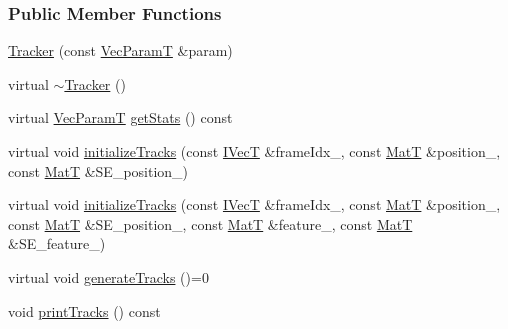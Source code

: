 \subsubsection*{Public Member Functions}
\begin{DoxyCompactItemize}
\item 
\hyperlink{classtracker_1_1Tracker_a27dea2aecabed66961d6d27b7a217d49}{Tracker} (const \hyperlink{classtracker_1_1Tracker_a1a79f7073d8e1a032369dcc8105604ce}{Vec\+ParamT} \&param)
\item 
virtual \hyperlink{classtracker_1_1Tracker_ab443f280a09da7d955e5e963a64b43cf}{$\sim$\+Tracker} ()
\item 
virtual \hyperlink{classtracker_1_1Tracker_a1a79f7073d8e1a032369dcc8105604ce}{Vec\+ParamT} \hyperlink{classtracker_1_1Tracker_a0ff525214ca14a98bacb8af427000cfa}{get\+Stats} () const 
\item 
virtual void \hyperlink{classtracker_1_1Tracker_a54cebc540275536380aca0d9ecb7e575}{initialize\+Tracks} (const \hyperlink{classtracker_1_1Tracker_a59a6e01be987f9c0093a8ac5ad97ce33}{I\+VecT} \&frame\+Idx\+\_\+, const \hyperlink{classtracker_1_1Tracker_a60a1d6ee07284ba82f0533c79311ccfd}{MatT} \&position\+\_\+, const \hyperlink{classtracker_1_1Tracker_a60a1d6ee07284ba82f0533c79311ccfd}{MatT} \&S\+E\+\_\+position\+\_\+)
\item 
virtual void \hyperlink{classtracker_1_1Tracker_a9fbf44fc368d294b47cd3bc48c0c69bd}{initialize\+Tracks} (const \hyperlink{classtracker_1_1Tracker_a59a6e01be987f9c0093a8ac5ad97ce33}{I\+VecT} \&frame\+Idx\+\_\+, const \hyperlink{classtracker_1_1Tracker_a60a1d6ee07284ba82f0533c79311ccfd}{MatT} \&position\+\_\+, const \hyperlink{classtracker_1_1Tracker_a60a1d6ee07284ba82f0533c79311ccfd}{MatT} \&S\+E\+\_\+position\+\_\+, const \hyperlink{classtracker_1_1Tracker_a60a1d6ee07284ba82f0533c79311ccfd}{MatT} \&feature\+\_\+, const \hyperlink{classtracker_1_1Tracker_a60a1d6ee07284ba82f0533c79311ccfd}{MatT} \&S\+E\+\_\+feature\+\_\+)
\item 
virtual void \hyperlink{classtracker_1_1Tracker_a14823a45c80086192c92aa90eb58ca17}{generate\+Tracks} ()=0
\item 
void \hyperlink{classtracker_1_1Tracker_a5d1d2a969102d181b69b23333c874fc3}{print\+Tracks} () const 
\end{DoxyCompactItemize}
